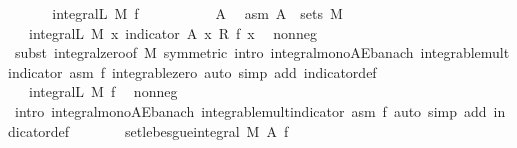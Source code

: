 \begin{isabellebody}
%
\isadelimproof
%
\endisadelimproof
%
\isatagproof
{}\isamarkupfalse%
\ \isanewline
\ \ \isamarkupfalse%
\ {\isacharasterisk}{\kern0pt}{\isacharcolon}{\kern0pt}\ {\isachardoublequoteopen}integral\isactrlsup L\ M\ f\ {\isacharequal}{\kern0pt}\ {}{\isachardoublequoteclose}\isanewline
\ \ \isacommand{{\isacharbraceleft}{\kern0pt}}\isamarkupfalse%
\isanewline
\ \ \ \ \isamarkupfalse%
\ A\ \isamarkupfalse%
\ asm{\isacharcolon}{\kern0pt}\ {\isachardoublequoteopen}A\ {\isasymin}\ sets\ M{\isachardoublequoteclose}\isanewline
\ \ \ \ \isamarkupfalse%
\ {\isachardoublequoteopen}{}\ {\isasymle}\ integral\isactrlsup L\ M\ {\isacharparenleft}{\kern0pt}{\isasymlambda}x{\isachardot}{\kern0pt}\ indicator\ A\ x\ {\isacharasterisk}{\kern0pt}\isactrlsub R\ f\ x{\isacharparenright}{\kern0pt}{\isachardoublequoteclose}\ \isamarkupfalse%
\ nonneg\ \isamarkupfalse%
\ {\isacharparenleft}{\kern0pt}subst\ integral{\isacharunderscore}{\kern0pt}zero{\isacharbrackleft}{\kern0pt}of\ M{\isacharcomma}{\kern0pt}\ symmetric{\isacharbrackright}{\kern0pt}{\isacharcomma}{\kern0pt}\ intro\ integral{\isacharunderscore}{\kern0pt}mono{\isacharunderscore}{\kern0pt}AE{\isacharunderscore}{\kern0pt}banach\ integrable{\isacharunderscore}{\kern0pt}mult{\isacharunderscore}{\kern0pt}indicator\ asm\ f\ integrable{\isacharunderscore}{\kern0pt}zero{\isacharcomma}{\kern0pt}\ auto\ simp\ add{\isacharcolon}{\kern0pt}\ indicator{\isacharunderscore}{\kern0pt}def{\isacharparenright}{\kern0pt}\isanewline
\ \ \ \ \isamarkupfalse%
\ \isamarkupfalse%
\ {\isachardoublequoteopen}{\isachardot}{\kern0pt}{\isachardot}{\kern0pt}{\isachardot}{\kern0pt}\ {\isasymle}\ integral\isactrlsup L\ M\ f{\isachardoublequoteclose}\ \isamarkupfalse%
\ nonneg\ \isamarkupfalse%
\ {\isacharparenleft}{\kern0pt}intro\ integral{\isacharunderscore}{\kern0pt}mono{\isacharunderscore}{\kern0pt}AE{\isacharunderscore}{\kern0pt}banach\ integrable{\isacharunderscore}{\kern0pt}mult{\isacharunderscore}{\kern0pt}indicator\ asm\ f{\isacharcomma}{\kern0pt}\ auto\ simp\ add{\isacharcolon}{\kern0pt}\ indicator{\isacharunderscore}{\kern0pt}def{\isacharparenright}{\kern0pt}\isanewline
\ \ \ \ \isamarkupfalse%
\ \isamarkupfalse%
\ {\isachardoublequoteopen}set{\isacharunderscore}{\kern0pt}lebesgue{\isacharunderscore}{\kern0pt}integral\ M\ A\ f\ {\isacharequal}{\kern0pt}\ {}{\isachardoublequoteclose}\ \isamarkupfalse%

\end{isabellebody}
